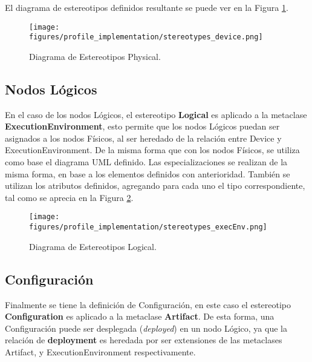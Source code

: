 El diagrama de estereotipos definidos resultante se puede ver en la Figura \ref{fig:profile:device}.

\begin{figure}[htbp]
    \centering
    \texttt{[image: figures/profile\_implementation/stereotypes\_device.png]}
    \caption{Diagrama de Estereotipos Physical.}
    \label{fig:profile:device}
\end{figure}

\subsection{Nodos Lógicos}
En el caso de los nodos Lógicos, el estereotipo \textbf{Logical} es aplicado a la metaclase \textbf{ExecutionEnvironment}, esto permite que los nodos Lógicos puedan ser asignados a los nodos Físicos, al ser heredado de la relación entre Device y ExecutionEnvironment. De la misma forma que con los nodos Físicos, se utiliza como base el diagrama UML definido. Las especializaciones se realizan de la misma forma, en base a los elementos definidos con anterioridad. También se utilizan los atributos definidos, agregando para cada uno el tipo correspondiente, tal como se aprecia en la Figura \ref{fig:profile:logical}.

\begin{figure}[htbp]
    \centering
    \texttt{[image: figures/profile\_implementation/stereotypes\_execEnv.png]}
    \caption{Diagrama de Estereotipos Logical.}
    \label{fig:profile:logical}
\end{figure}

\subsection{Configuración}
Finalmente se tiene la definición de Configuración, en este caso el estereotipo \textbf{Configuration} es aplicado a la metaclase \textbf{Artifact}. De esta forma, una Configuración puede ser desplegada (\textit{deployed}) en un nodo Lógico, ya que la relación de \textbf{deployment} es heredada por ser extensiones de las metaclases Artifact, y ExecutionEnvironment respectivamente.

